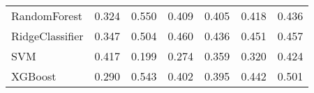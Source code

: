 \begin{tabular}{lllllll}
                   RandomForest & 0.324 &                     0.550 &                 0.409 &                  0.405 &                                   0.418 &     0.436 \\
                RidgeClassifier & 0.347 &                     0.504 &                 0.460 &                  0.436 &                                   0.451 &     0.457 \\
                            SVM & 0.417 &                     0.199 &                 0.274 &                  0.359 &                                   0.320 &     0.424 \\
                        XGBoost & 0.290 &                     0.543 &                 0.402 &                  0.395 &                                   0.442 &     0.501 \\
\bottomrule
\end{tabular}
